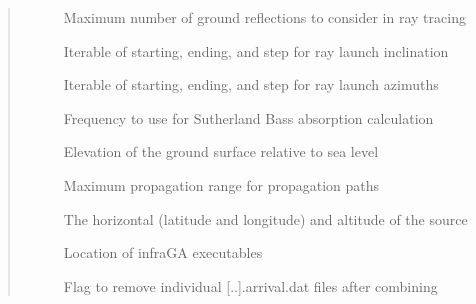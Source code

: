 \documentclass[letterpaper,10pt,english]{sphinxmanual}
\begin{document}
\begin{fulllineitems}
\begin{quote}
\begin{description}
\begin{description}
\item[{}] \leavevmode
Maximum number of ground reflections to consider in ray tracing

\item[{}] \leavevmode
Iterable of starting, ending, and step for ray launch inclination

\item[{}] \leavevmode
Iterable of starting, ending, and step for ray launch azimuths

\item[{}] \leavevmode
Frequency to use for Sutherland Bass absorption calculation

\item[{}] \leavevmode
Elevation of the ground surface relative to sea level

\item[{}] \leavevmode
Maximum propagation range for propagation paths

\item[{}] \leavevmode
The horizontal (latitude and longitude) and altitude of the source

\item[{}] \leavevmode
Location of infraGA executables

\item[{}] \leavevmode
Flag to remove individual {[}..{]}.arrival.dat files after combining

\end{description}

\end{description}\end{quote}

\end{fulllineitems}

\end{document}
